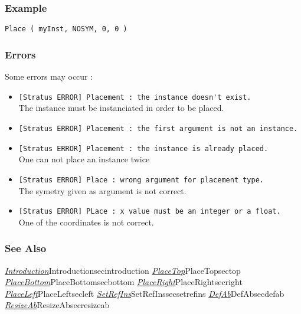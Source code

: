 \subsubsection{Example}

\begin{verbatim}
Place ( myInst, NOSYM, 0, 0 )
\end{verbatim}

\subsubsection{Errors}
    
Some errors may occur :
\begin{itemize}
    \item \verb-[Stratus ERROR] Placement : the instance doesn't exist.-\\The instance must be instanciated in order to be placed.
    \item \verb-[Stratus ERROR] Placement : the first argument is not an instance.-
    \item \verb-[Stratus ERROR] Placement : the instance is already placed.-\\One can not place an instance twice
    \item \verb-[Stratus ERROR] Place : wrong argument for placement type.-\\The symetry given as argument is not correct.
    \item \verb-[Stratus ERROR] PLace : x value must be an integer or a float.-\\One of the coordinates is not correct.
\end{itemize}
        
\subsubsection{See Also}

\hyperref[ref]{\emph{Introduction}}{}{Introduction}{secintroduction}
\hyperref[ref]{\emph{PlaceTop}}{}{PlaceTop}{sectop}
\hyperref[ref]{\emph{PlaceBottom}}{}{PlaceBottom}{secbottom}
\hyperref[ref]{\emph{PlaceRight}}{}{PlaceRight}{secright}
\hyperref[ref]{\emph{PlaceLeft}}{}{PlaceLeft}{secleft}
\hyperref[ref]{\emph{SetRefIns}}{}{SetRefIns}{secsetrefins}
\hyperref[ref]{\emph{DefAb}}{}{DefAb}{secdefab}
\hyperref[ref]{\emph{ResizeAb}}{}{ResizeAb}{secresizeab}
